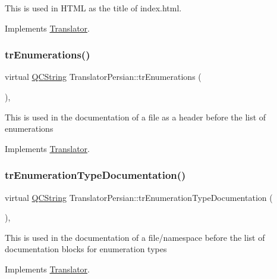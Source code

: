 This is used in H\+T\+ML as the title of index.\+html. 

Implements \mbox{\hyperlink{class_translator}{Translator}}.

\mbox{\label{class_translator_persian_a53840b14cf091887f04e70bc70e7b1d3}} 
\subsubsection{\texorpdfstring{trEnumerations()}{trEnumerations()}}
{\footnotesize\ttfamily virtual \mbox{\hyperlink{class_q_c_string}{Q\+C\+String}} Translator\+Persian\+::tr\+Enumerations (\begin{DoxyParamCaption}{ }\end{DoxyParamCaption})\hspace{0.3cm}{\ttfamily [inline]}, {\ttfamily [virtual]}}

This is used in the documentation of a file as a header before the list of enumerations 

Implements \mbox{\hyperlink{class_translator}{Translator}}.

\mbox{\label{class_translator_persian_a005b6d972851319c9dac4f3e687644a7}} 
\subsubsection{\texorpdfstring{trEnumerationTypeDocumentation()}{trEnumerationTypeDocumentation()}}
{\footnotesize\ttfamily virtual \mbox{\hyperlink{class_q_c_string}{Q\+C\+String}} Translator\+Persian\+::tr\+Enumeration\+Type\+Documentation (\begin{DoxyParamCaption}{ }\end{DoxyParamCaption})\hspace{0.3cm}{\ttfamily [inline]}, {\ttfamily [virtual]}}

This is used in the documentation of a file/namespace before the list of documentation blocks for enumeration types 

Implements \mbox{\hyperlink{class_translator}{Translator}}.

